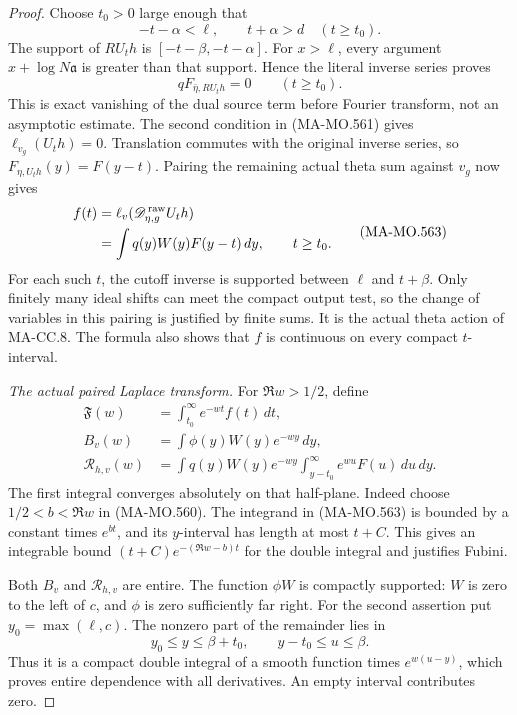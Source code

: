\begin{proof}
Choose \(t_0>0\) large enough that
\[
                 -t-\alpha<\ell,\qquad t+\alpha>d
                              \quad(t\ge t_0).
 \tag{MA-MO.561}
\]
The support of \(RU_th\) is
\([-t-\beta,-t-\alpha]\). For \(x>\ell\), every
argument \(x+\log N\mathfrak a\) is greater than that
support. Hence the literal inverse series proves
\[
             qF_{\bar\eta,RU_th}=0\qquad(t\ge t_0).
 \tag{MA-MO.562}
\]
This is exact vanishing of the dual source term before
Fourier transform, not an asymptotic estimate. The second
condition in (MA-MO.561) gives
\(\ell_{v_g}(U_th)=0\). Translation commutes with the
original inverse series, so
\(F_{\eta,U_th}(y)=F(y-t)\). Pairing the remaining
actual theta sum against \(v_g\) now gives
\[
 \begin{aligned}
 f(t)&=\ell_v(\mathscr D^{\,\rm raw}_{\eta,g}U_th)\\
     &=\int q(y)W(y)F(y-t)\,dy,\qquad t\ge t_0 .
 \end{aligned}
 \tag{MA-MO.563}
\]
For each such \(t\), the cutoff inverse is supported
between \(\ell\) and \(t+\beta\). Only finitely many
ideal shifts can meet the compact output test, so the
change of variables in this pairing is justified by
finite sums. It is the actual theta action of MA-CC.8.
The formula also shows that \(f\) is continuous on
every compact \(t\)-interval.

\emph{The actual paired Laplace transform.}
For \(\Re w>1/2\), define
\[
 \begin{aligned}
 \mathfrak F(w)&=\int_{t_0}^\infty e^{-wt}f(t)\,dt,\\
 B_v(w)&=\int \phi(y)W(y)e^{-wy}\,dy,\\
 \mathcal R_{h,v}(w)
    &=\int q(y)W(y)e^{-wy}
          \int_{y-t_0}^\infty e^{wu}F(u)\,du\,dy .
 \end{aligned}
 \tag{MA-MO.564}
\]
The first integral converges absolutely on that half-plane.
Indeed choose \(1/2<b<\Re w\) in (MA-MO.560). The
integrand in (MA-MO.563) is bounded by a constant times
\(e^{bt}\), and its \(y\)-interval has length at most
\(t+C\). This gives an integrable bound
\((t+C)e^{-(\Re w-b)t}\) for the double integral and
justifies Fubini.

Both \(B_v\) and \(\mathcal R_{h,v}\) are entire.
The function \(\phi W\) is compactly supported: \(W\)
is zero to the left of \(c\), and \(\phi\) is zero
sufficiently far right. For the second assertion put
\(y_0=\max(\ell,c)\). The nonzero part of the remainder
lies in
\[
       y_0\le y\le\beta+t_0,\qquad
                    y-t_0\le u\le\beta .
 \tag{MA-MO.565}
\]
Thus it is a compact double integral of a smooth
function times \(e^{w(u-y)}\), which proves entire
dependence with all derivatives. An empty interval
contributes zero.


\end{proof}

